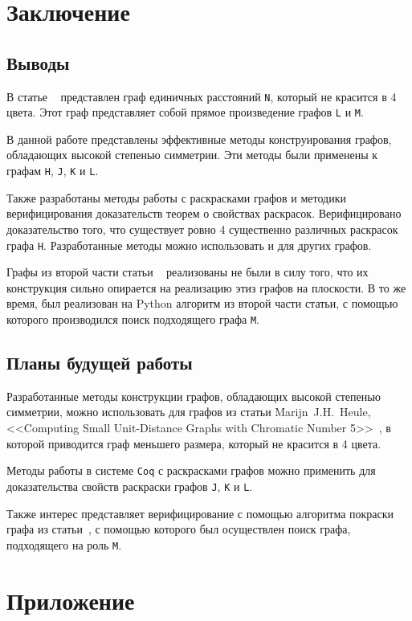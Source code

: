 \chapter{Заключение}
\section{Выводы}
В статье ~\cite{deGrey} представлен граф единичных расстояний {\tt N}, который не красится в 4 цвета. Этот граф представляет собой прямое произведение графов {\tt L} и {\tt M}.

В данной работе представлены эффективные методы конструирования графов, обладающих высокой степенью симметрии. Эти методы были применены к графам {\tt H}, {\tt J}, {\tt K} и {\tt L}.

Также разработаны методы работы с раскрасками графов и методики верифицирования доказательств теорем о свойствах раскрасок. Верифицировано доказательство того, что существует ровно 4 существенно различных раскрасок графа {\tt H}. Разработанные методы можно использовать и для других графов.

Графы из второй части статьи ~\cite{deGrey} реализованы не были в силу того, что их конструкция сильно опирается на реализацию этиз графов на плоскости. В то же время, был реализован на Python алгоритм из второй части статьи, с помощью которого производился поиск подходящего графа {\tt M}.

\section{Планы будущей работы}
Разработанные методы конструкции графов, обладающих высокой степенью симметрии, можно использовать для графов из статьи Marijn~J.H.~Heule, <<Computing Small Unit-Distance Graphs with Chromatic Number 5>>~\cite{Huele}, в которой приводится граф меньшего размера, который не красится в 4 цвета.

Методы работы в системе {\tt Coq} с раскрасками графов можно применить для доказательства свойств раскраски графов {\tt J}, {\tt K} и {\tt L}.

Также интерес представляет верифицирование с помощью {\Coq} алгоритма покраски графа из статьи~\cite{deGrey}, с помощью которого был осуществлен поиск графа, подходящего на роль {\tt M}.

\chapter{Приложение}

